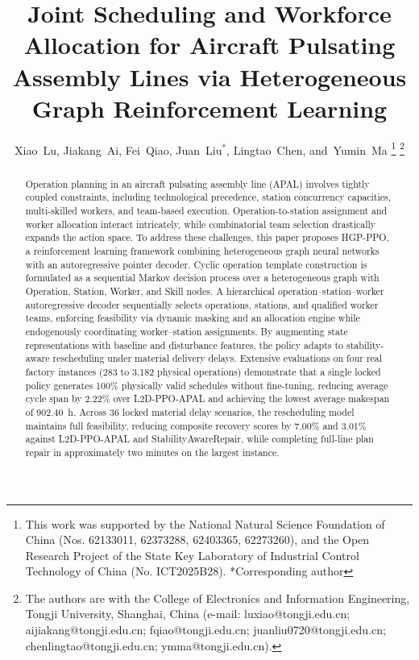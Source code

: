 \documentclass[journal,10pt]{IEEEtran}
\begin{document}
\title{Joint Scheduling and Workforce Allocation for Aircraft Pulsating Assembly Lines via Heterogeneous Graph Reinforcement Learning}

\author{Xiao~Lu,
        Jiakang~Ai,
        Fei~Qiao,
        Juan~Liu$^*$,
        Lingtao~Chen,
        and~Yumin~Ma%
\thanks{This work was supported by the National Natural Science Foundation of China (Nos. 62133011, 62373288, 62403365, 62273260), and the Open Research Project of the State Key Laboratory of Industrial Control Technology of China (No. ICT2025B28). *Corresponding author}%
\thanks{The authors are with the College of Electronics and Information Engineering, Tongji University, Shanghai, China (e-mail: luxiao@tongji.edu.cn; aijiakang@tongji.edu.cn; fqiao@tongji.edu.cn; juanliu0720@tongji.edu.cn; chenlingtao@tongji.edu.cn; ymma@tongji.edu.cn).}%
}


\maketitle

\begin{abstract}
Operation planning in an aircraft pulsating assembly line (APAL) involves tightly coupled constraints, including technological precedence, station concurrency capacities, multi-skilled workers, and team-based execution. Operation-to-station assignment and worker allocation interact intricately, while combinatorial team selection drastically expands the action space. To address these challenges, this paper proposes HGP-PPO, a reinforcement learning framework combining heterogeneous graph neural networks with an autoregressive pointer decoder. Cyclic operation template construction is formulated as a sequential Markov decision process over a heterogeneous graph with Operation, Station, Worker, and Skill nodes. A hierarchical operation--station--worker autoregressive decoder sequentially selects operations, stations, and qualified worker teams, enforcing feasibility via dynamic masking and an allocation engine while endogenously coordinating worker--station assignments. By augmenting state representations with baseline and disturbance features, the policy adapts to stability-aware rescheduling under material delivery delays. Extensive evaluations on four real factory instances (283 to 3,182 physical operations) demonstrate that a single locked policy generates 100\% physically valid schedules without fine-tuning, reducing average cycle span by 2.22\% over L2D-PPO-APAL and achieving the lowest average makespan of 902.40~h. Across 36 locked material delay scenarios, the rescheduling model maintains full feasibility, reducing composite recovery scores by 7.00\% and 3.01\% against L2D-PPO-APAL and StabilityAwareRepair, while completing full-line plan repair in approximately two minutes on the largest instance.
\end{abstract}
\end{document}
